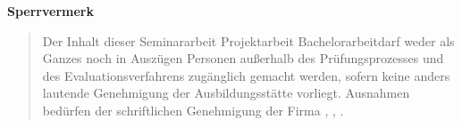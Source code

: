 \begin{titlepage}
	\begin{center}
		\vspace*{1cm}
		\Huge\bf Sperrvermerk\\
		\vspace*{2cm}
		\normalsize\rm
		\begin{quotation}
			\parbox{0.8\textwidth}{Der Inhalt dieser \ifcase\myType Seminararbeit \or Projektarbeit \or Bachelorarbeit\else\fi darf weder als Ganzes noch in Auszügen Personen außerhalb des Prüfungsprozesses und des Evaluationsverfahrens zugänglich gemacht werden, sofern keine anders lautende Genehmigung der Ausbildungsstätte vorliegt. Ausnahmen bedürfen der schriftlichen Genehmigung der Firma \myCompany, \myCompanyAddressStreet, \myCompanyAddressCity.}
		\end{quotation}
		\vspace*{1cm}
	\end{center}
\end{titlepage}
\newpage
\setcounter{page}{3}
